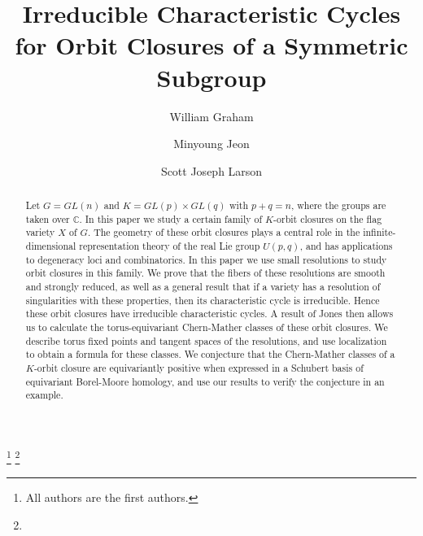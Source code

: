 \documentclass[11pt,letterpaper,reqno]{amsart}
\numberwithin{equation}{section}
\theoremstyle{plain}
\theoremstyle{definition}
\theoremstyle{remark}
\newcommand{\C}{\mathbb{C}}
\begin{document}
\title[Irreducible Characteristic Cycles]{Irreducible Characteristic Cycles for Orbit Closures of a Symmetric Subgroup}

\author{William Graham}
\address{Department of Mathematics, University of Georgia, Athens GA 30602, USA}
\author{Minyoung Jeon}
\address{Center for Complex Geometry, Institute for Basic Science (IBS), Daejeon, 34126, Republic of Korea}
\author{Scott Joseph Larson}
\address{Department of Mathematics, University of Georgia, Athens GA 30602, USA}
\thanks{All authors are the first authors.}
\thanks{}



\begin{abstract}
 Let $G = GL(n)$ and $K = GL(p) \times GL(q)$ with $p+q=n$, where the groups are taken over $\C$.  In this paper we study a certain family of $K$-orbit closures
on the flag variety $X$ of $G$.  The geometry of these orbit closures plays a central role in the infinite-dimensional 
representation theory of the real Lie group $U(p,q)$, and has applications to degeneracy loci and combinatorics. 
In this paper we use small resolutions to study orbit closures in this family.  We prove that the fibers of these resolutions
are smooth and strongly reduced, as well as a general result that if a variety has a resolution of singularities with these properties, then its characteristic cycle is irreducible.
Hence these orbit closures have irreducible characteristic cycles.  A result of Jones then allows us to calculate the 
torus-equivariant Chern-Mather classes of these orbit closures.
We describe torus fixed points and tangent spaces of the resolutions, and use localization to obtain a formula for these classes.
We conjecture that the Chern-Mather classes of a $K$-orbit closure are equivariantly positive when
expressed in a Schubert basis of equivariant Borel-Moore homology, and use our results to verify the conjecture in
an example.
\end{abstract}



\maketitle 

\thispagestyle{empty}
\setcounter{tocdepth}{1}
\parskip=4pt \baselineskip=14pt
\end{document}
